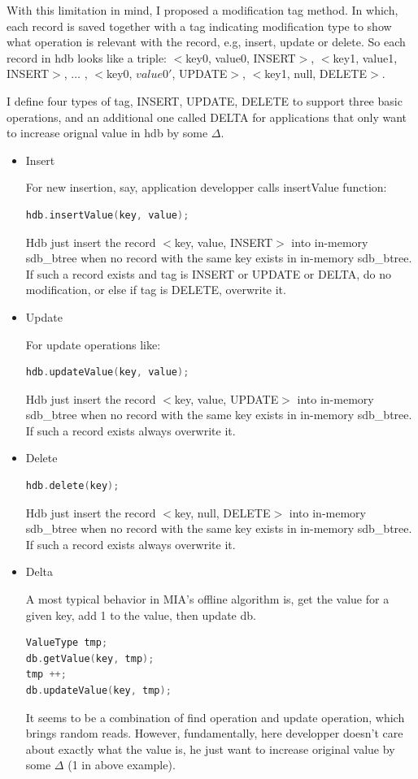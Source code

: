 \documentclass[a4paper,10pt]{article}
\begin{document}
With this limitation in mind, I proposed a modification tag method. In which, each record is saved together with a tag indicating modification type to show what operation is relevant with the record, e.g, insert, update or delete.
So each record in hdb looks like a triple: $<$key0, value0, INSERT$>$, $<$key1, value1, INSERT$>$, $\dots$ , $<$key0, $value0'$, UPDATE$>$, $<$key1, null, DELETE$>$.

I define four types of tag, INSERT, UPDATE, DELETE to support three basic operations, and an additional one called DELTA for applications that only want to increase orignal value in hdb by some $\Delta$.

\begin{itemize}
\item Insert

For new insertion, say, application developper calls insertValue function:
\begin{lstlisting}[language=C]
hdb.insertValue(key, value); 
\end{lstlisting}
Hdb just insert the record $<$key, value, INSERT$>$ into in-memory sdb\_btree when no record with the same key exists in in-memory sdb\_btree. If such a record exists and tag is INSERT or UPDATE or DELTA, do no modification,
or else if tag is DELETE, overwrite it.

\item Update

For update operations like:
\begin{lstlisting}[language=C]
hdb.updateValue(key, value); 
\end{lstlisting}
Hdb just insert the record $<$key, value, UPDATE$>$ into in-memory sdb\_btree when no record with the same key exists in in-memory sdb\_btree. If such a record exists always overwrite it.

\item Delete

\begin{lstlisting}[language=C]
hdb.delete(key); 
\end{lstlisting}
Hdb just insert the record $<$key, null, DELETE$>$ into in-memory sdb\_btree when no record with the same key exists in in-memory sdb\_btree. If such a record exists always overwrite it.

\item Delta

A most typical behavior in MIA's offline algorithm is, get the value for a given key, add 1 to the value, then update db.
\begin{lstlisting}[language=C]
ValueType tmp;
db.getValue(key, tmp);
tmp ++;
db.updateValue(key, tmp);
\end{lstlisting}
It seems to be a combination of find operation and update operation, which brings random reads. However, fundamentally, here developper doesn't care about exactly what the value is,
he just want to increase original value by some $\Delta$ (1 in above example).


\end{itemize}
\end{document}
